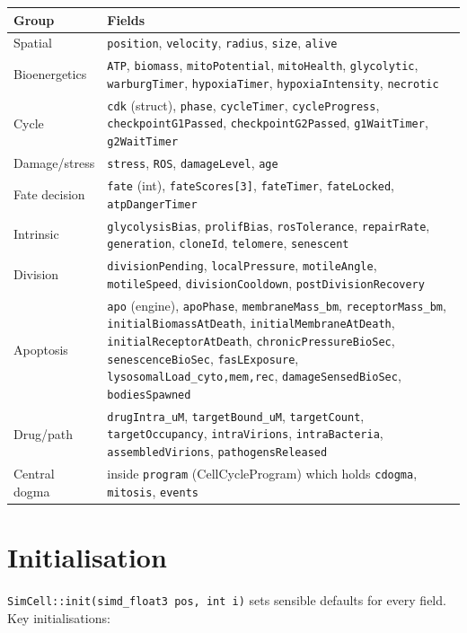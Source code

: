 \documentclass[11pt,letterpaper,twoside,openany]{book}
\newcommand{\code}[1]{\texttt{#1}}
\begin{document}
\begin{longtable}{lp{9.5cm}}
\toprule
\textbf{Group} & \textbf{Fields}\\ \midrule
Spatial       & \code{position}, \code{velocity}, \code{radius}, \code{size}, \code{alive}\\
Bioenergetics & \code{ATP}, \code{biomass}, \code{mitoPotential}, \code{mitoHealth}, \code{glycolytic}, \code{warburgTimer}, \code{hypoxiaTimer}, \code{hypoxiaIntensity}, \code{necrotic}\\
Cycle         & \code{cdk} (struct), \code{phase}, \code{cycleTimer}, \code{cycleProgress}, \code{checkpointG1Passed}, \code{checkpointG2Passed}, \code{g1WaitTimer}, \code{g2WaitTimer}\\
Damage/stress & \code{stress}, \code{ROS}, \code{damageLevel}, \code{age}\\
Fate decision & \code{fate} (int), \code{fateScores[3]}, \code{fateTimer}, \code{fateLocked}, \code{atpDangerTimer}\\
Intrinsic     & \code{glycolysisBias}, \code{prolifBias}, \code{rosTolerance}, \code{repairRate}, \code{generation}, \code{cloneId}, \code{telomere}, \code{senescent}\\
Division      & \code{divisionPending}, \code{localPressure}, \code{motileAngle}, \code{motileSpeed}, \code{divisionCooldown}, \code{postDivisionRecovery}\\
Apoptosis     & \code{apo} (engine), \code{apoPhase}, \code{membraneMass\_bm}, \code{receptorMass\_bm}, \code{initialBiomassAtDeath}, \code{initialMembraneAtDeath}, \code{initialReceptorAtDeath}, \code{chronicPressureBioSec}, \code{senescenceBioSec}, \code{fasLExposure}, \code{lysosomalLoad\_{cyto,mem,rec}}, \code{damageSensedBioSec}, \code{bodiesSpawned}\\
Drug/path     & \code{drugIntra\_uM}, \code{targetBound\_uM}, \code{targetCount}, \code{targetOccupancy}, \code{intraVirions}, \code{intraBacteria}, \code{assembledVirions}, \code{pathogensReleased}\\
Central dogma & inside \code{program} (CellCycleProgram) which holds \code{cdogma}, \code{mitosis}, \code{events}\\
\bottomrule
\end{longtable}

\section{Initialisation}

\code{SimCell::init(simd\_float3 pos, int i)} sets sensible defaults
for every field. Key initialisations:
\end{document}
